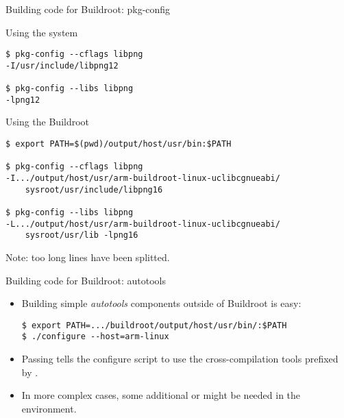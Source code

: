 \begin{frame}[fragile]{Building code for Buildroot: pkg-config}

  \begin{block}{Using the system }
{\small
\begin{verbatim}
$ pkg-config --cflags libpng
-I/usr/include/libpng12

$ pkg-config --libs libpng
-lpng12
\end{verbatim}}
  \end{block}

  \begin{block}{Using the Buildroot }
{\small
\begin{verbatim}
$ export PATH=$(pwd)/output/host/usr/bin:$PATH

$ pkg-config --cflags libpng
-I.../output/host/usr/arm-buildroot-linux-uclibcgnueabi/
    sysroot/usr/include/libpng16

$ pkg-config --libs libpng
-L.../output/host/usr/arm-buildroot-linux-uclibcgnueabi/
    sysroot/usr/lib -lpng16
\end{verbatim}}
  \end{block}

{\tiny Note: too long lines have been splitted.}

\end{frame}

\begin{frame}[fragile]{Building code for Buildroot: autotools}
  \begin{itemize}
  \item Building simple {\em autotools} components outside of
    Buildroot is easy:
    \begin{block}{}
{\small
\begin{verbatim}
$ export PATH=.../buildroot/output/host/usr/bin/:$PATH
$ ./configure --host=arm-linux
\end{verbatim}}
\end{block}
\item Passing  tells the configure script to
  use the cross-compilation tools prefixed by .
\item In more complex cases, some additional  or
   might be needed in the environment.
  \end{itemize}
\end{frame}

